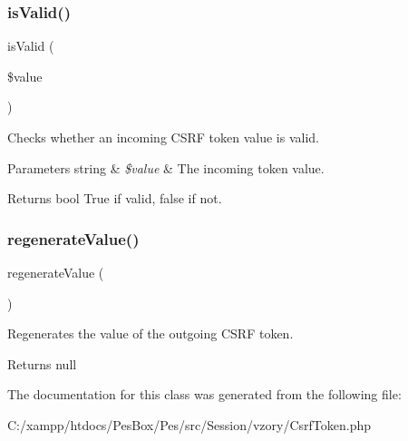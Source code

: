 \subsubsection{\texorpdfstring{is\+Valid()}{isValid()}}
{\footnotesize\ttfamily is\+Valid (\begin{DoxyParamCaption}\item[{}]{\$value }\end{DoxyParamCaption})}

Checks whether an incoming C\+S\+RF token value is valid.


\begin{DoxyParams}[1]{Parameters}
string & {\em \$value} & The incoming token value.\\
\hline
\end{DoxyParams}
\begin{DoxyReturn}{Returns}
bool True if valid, false if not. 
\end{DoxyReturn}
\mbox{\label{class_aura_1_1_session_1_1_csrf_token_ab839d177349b3374a9348ad77f884f88}} 
\subsubsection{\texorpdfstring{regenerate\+Value()}{regenerateValue()}}
{\footnotesize\ttfamily regenerate\+Value (\begin{DoxyParamCaption}{ }\end{DoxyParamCaption})}

Regenerates the value of the outgoing C\+S\+RF token.

\begin{DoxyReturn}{Returns}
null 
\end{DoxyReturn}


The documentation for this class was generated from the following file\+:\begin{DoxyCompactItemize}
\item 
C\+:/xampp/htdocs/\+Pes\+Box/\+Pes/src/\+Session/vzory/Csrf\+Token.\+php\end{DoxyCompactItemize}
